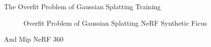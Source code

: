 The Overfit Problem of Gaussian Splatting Training 

\begin{figure}[H]
    
    \caption{Overfit Problem of Gaussian Splatting NeRF Synthetic Ficus}
\end{figure}



And Mip NeRF 360
